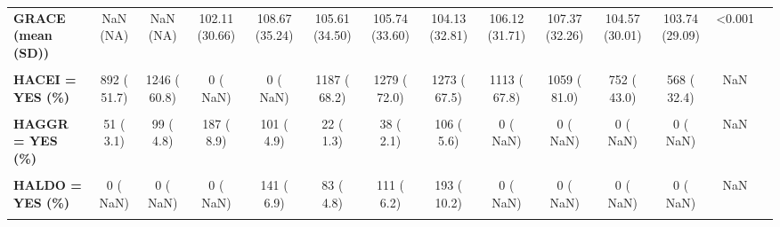\documentclass[
]{article}
\begin{document}
\begin{table}[H]
\begin{tabular}[t]{>{\raggedright\arraybackslash}p{5em}ccccccccccccc}
\textbf{GRACE (mean (SD))} & NaN (NA) & NaN (NA) & 102.11 (30.66) & 108.67 (35.24) & 105.61 (34.50) & 105.74 (33.60) & 104.13 (32.81) & 106.12 (31.71) & 107.37 (32.26) & 104.57 (30.01) & 103.74 (29.09) & <0.001 & \\
\textbf{\cellcolor{gray!10}{HACEARB = YES (\%)}} & \cellcolor{gray!10}{926 ( 51.6)} & \cellcolor{gray!10}{1303 ( 63.6)} & \cellcolor{gray!10}{1502 ( 71.7)} & \cellcolor{gray!10}{1590 ( 77.4)} & \cellcolor{gray!10}{1304 ( 74.9)} & \cellcolor{gray!10}{1419 ( 79.9)} & \cellcolor{gray!10}{1491 ( 79.1)} & \cellcolor{gray!10}{1373 ( 82.7)} & \cellcolor{gray!10}{1319 ( 90.7)} & \cellcolor{gray!10}{932 ( 53.3)} & \cellcolor{gray!10}{768 ( 43.8)} & \cellcolor{gray!10}{<0.001} & \cellcolor{gray!10}{}\\
\textbf{HACEI = YES (\%)} & 892 ( 51.7) & 1246 ( 60.8) & 0 (  NaN) & 0 (  NaN) & 1187 ( 68.2) & 1279 ( 72.0) & 1273 ( 67.5) & 1113 ( 67.8) & 1059 ( 81.0) & 752 ( 43.0) & 568 ( 32.4) & NaN & \\
\textbf{\cellcolor{gray!10}{HACOAG = YES (\%)}} & \cellcolor{gray!10}{376 ( 21.9)} & \cellcolor{gray!10}{26 (  1.3)} & \cellcolor{gray!10}{76 (  3.6)} & \cellcolor{gray!10}{83 (  4.2)} & \cellcolor{gray!10}{73 (  4.2)} & \cellcolor{gray!10}{71 (  4.0)} & \cellcolor{gray!10}{104 (  5.5)} & \cellcolor{gray!10}{104 (  5.8)} & \cellcolor{gray!10}{116 ( 12.8)} & \cellcolor{gray!10}{100 (  5.7)} & \cellcolor{gray!10}{102 (  5.8)} & \cellcolor{gray!10}{<0.001} & \cellcolor{gray!10}{}\\
\textbf{HAGGR = YES (\%)} & 51 (  3.1) & 99 (  4.8) & 187 (  8.9) & 101 (  4.9) & 22 (  1.3) & 38 (  2.1) & 106 (  5.6) & 0 (  NaN) & 0 (  NaN) & 0 (  NaN) & 0 (  NaN) & NaN & \\
\textbf{\cellcolor{gray!10}{HAICD = YES (\%)}} & \cellcolor{gray!10}{5 (  0.3)} & \cellcolor{gray!10}{5 (  0.2)} & \cellcolor{gray!10}{7 (  0.3)} & \cellcolor{gray!10}{6 (  0.3)} & \cellcolor{gray!10}{9 (  0.5)} & \cellcolor{gray!10}{11 (  0.6)} & \cellcolor{gray!10}{9 (  0.5)} & \cellcolor{gray!10}{4 (  0.2)} & \cellcolor{gray!10}{8 (  0.4)} & \cellcolor{gray!10}{14 (  0.8)} & \cellcolor{gray!10}{11 (  0.6)} & \cellcolor{gray!10}{0.146} & \cellcolor{gray!10}{}\\
\textbf{HALDO = YES (\%)} & 0 (  NaN) & 0 (  NaN) & 0 (  NaN) & 141 (  6.9) & 83 (  4.8) & 111 (  6.2) & 193 ( 10.2) & 0 (  NaN) & 0 (  NaN) & 0 (  NaN) & 0 (  NaN) & NaN & \\
\textbf{\cellcolor{gray!10}{HANGIO = YES (\%)}} & \cellcolor{gray!10}{982 ( 55.9)} & \cellcolor{gray!10}{1141 ( 55.7)} & \cellcolor{gray!10}{1102 ( 52.9)} & \cellcolor{gray!10}{1254 ( 61.1)} & \cellcolor{gray!10}{1094 ( 63.2)} & \cellcolor{gray!10}{1094 ( 62.1)} & \cellcolor{gray!10}{1129 ( 60.9)} & \cellcolor{gray!10}{1127 ( 64.1)} & \cellcolor{gray!10}{1167 ( 65.7)} & \cellcolor{gray!10}{988 ( 56.7)} & \cellcolor{gray!10}{1091 ( 63.1)} & \cellcolor{gray!10}{<0.001} & \cellcolor{gray!10}{}\\

\end{tabular}
\end{table}
\end{document}
